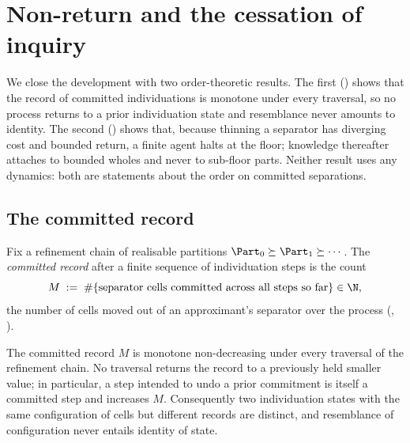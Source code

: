 
\section{Non-return and the cessation of inquiry}
\label{sec:inquiry}

We close the development with two order-theoretic results. The first
() shows that the record of committed individuations is
monotone under every traversal, so no process returns to a prior individuation
state and resemblance never amounts to identity. The second
() shows that, because thinning a separator has diverging
cost and bounded return, a finite agent halts at the floor; knowledge thereafter
attaches to bounded wholes and never to sub-floor parts. Neither result uses any
dynamics: both are statements about the order on committed separations.

\subsection{The committed record}

\begin{definition}
\label{def:record}
Fix a refinement chain of realisable partitions
$\Part_0\succeq\Part_1\succeq\cdots$. The \emph{committed record} after a finite
sequence of individuation steps is the count
\[
M\;:=\;\#\{\text{separator cells committed across all steps so far}\}\in\N,
\]
the number of cells moved out of an approximant's separator over the process
\textup{(}, \textup{)}.
\end{definition}

\begin{theorem}
\label{thm:nonreturn}
The committed record $M$ is monotone non-decreasing under every traversal of the
refinement chain. No traversal returns the record to a previously held smaller
value; in particular, a step intended to undo a prior commitment is itself a
committed step and increases $M$. Consequently two individuation states with the
same configuration of cells but different records are distinct, and resemblance
of configuration never entails identity of state.
\end{theorem}


